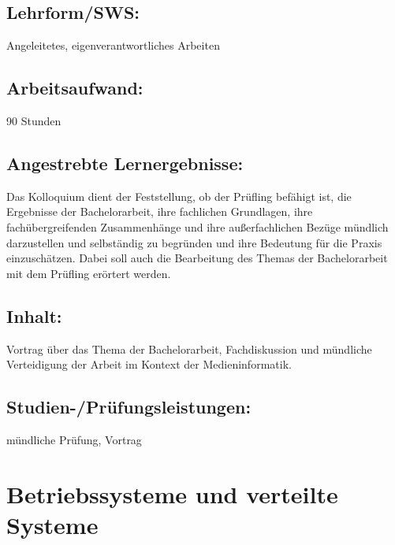 \section*{Lehrform/SWS:}\label{lehrformsws-4}

Angeleitetes, eigenverantwortliches Arbeiten

\section*{Arbeitsaufwand:}\label{arbeitsaufwand-4}

90 Stunden

\section*{Angestrebte
Lernergebnisse:}\label{angestrebte-lernergebnisse-4}

Das Kolloquium dient der Feststellung, ob der Prüfling befähigt ist, die
Ergebnisse der Bachelorarbeit, ihre fachlichen Grundlagen, ihre
fachübergreifenden Zusammenhänge und ihre außerfachlichen Bezüge
mündlich darzustellen und selbständig zu begründen und ihre Bedeutung
für die Praxis einzuschätzen. Dabei soll auch die Bearbeitung des Themas
der Bachelorarbeit mit dem Prüfling erörtert werden.

\section*{Inhalt:}\label{inhalt-4}

Vortrag über das Thema der Bachelorarbeit, Fachdiskussion und mündliche
Verteidigung der Arbeit im Kontext der Medieninformatik.

\section*{Studien-/Prüfungsleistungen:}\label{studien-pruxfcfungsleistungen-3}

mündliche Prüfung, Vortrag

\chapter{Betriebssysteme und verteilte
Systeme}\label{betriebssysteme-und-verteilte-systeme}

